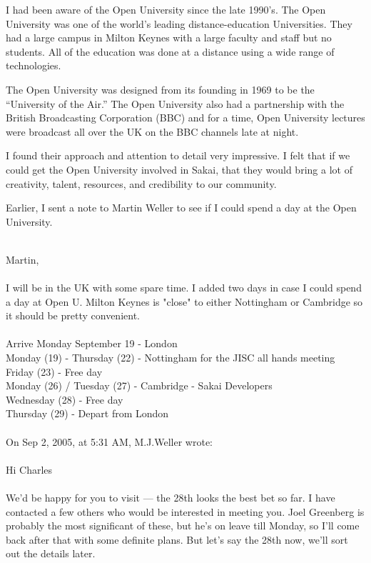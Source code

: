 \documentclass[12pt]{book}
\begin{document}
I had been aware of the Open University since the late
1990's.  The Open University was one of the world's
leading distance-education Universities.  They had a
large campus in Milton Keynes with a large faculty
and staff but no students.
All of the education was done at a distance using
a wide range of technologies.

The Open University
was designed from its founding in 1969 to be
the ``University of the Air.''  The Open University
also had a partnership with the British Broadcasting
Corporation (BBC) and for a time, Open University
lectures were broadcast all over the UK on the
BBC channels late at night.

I found their approach and attention
to detail very impressive.
I felt that if we could get the Open University
involved in Sakai, that they would bring a lot
of creativity, talent, resources, and credibility
to our community.

Earlier, I sent a note to Martin Weller to see if I could
spend a day at the Open University.\\
\\
\begin{sf}
Martin,\\
\\
I will be in the UK with some spare time.  I added
two days in case I could spend a day at Open U.
Milton Keynes is "close" to either Nottingham or
Cambridge so it should be pretty convenient.\\
\\
Arrive Monday September 19 - London\\
Monday (19) - Thursday (22) - Nottingham for the JISC all hands meeting\\
Friday (23) - Free day\\
Monday (26) / Tuesday (27) - Cambridge - Sakai Developers\\
Wednesday (28) - Free day\\
Thursday (29) - Depart from London\\
\\
On Sep 2, 2005, at 5:31 AM, M.J.Weller wrote:\\
\\
Hi Charles\\
\\
We'd be happy for you to visit --- the 28th looks the
best bet so far. I have contacted a few others who
would be interested in meeting you. Joel Greenberg
is probably the most significant of these, but he's
on leave till Monday, so I'll come back after that
with some definite plans. But let's say the 28th
now, we'll sort out the details later.\\
\end{sf}
\end{document}
